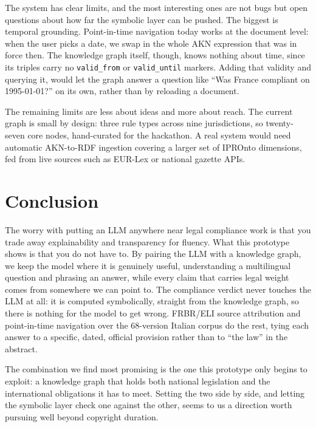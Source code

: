 \documentclass[12pt,a4paper]{article}
\begin{document}
The system has clear limits, and the most interesting ones are not bugs but
open questions about how far the symbolic layer can be pushed. The biggest is
temporal grounding. Point-in-time navigation today works at the document
level: when the user picks a date, we swap in the whole AKN expression that
was in force then. The knowledge graph itself, though, knows nothing about
time, since its triples carry no \texttt{valid\_from} or \texttt{valid\_until}
markers. Adding that validity and querying it, would let the graph answer a question like ``Was France compliant on
1995-01-01?'' on its own, rather than by reloading a document. 

The remaining limits are less about ideas and more about reach. The current
graph is small by design: three rule types across nine jurisdictions, so
twenty-seven core nodes, hand-curated for the hackathon. A real system would
need automatic AKN-to-RDF ingestion covering a larger set of IPROnto dimensions, fed from live sources such as EUR-Lex or national gazette APIs.


\section{Conclusion}

The worry with putting an LLM anywhere near legal compliance work is that you trade away explainability and transparency for fluency. What this prototype shows is that you do not have to. By pairing the LLM with a knowledge graph, we keep the model where it is genuinely useful, understanding a multilingual question and phrasing an answer, while every claim that carries legal weight comes from somewhere we can point to. The compliance verdict never touches the LLM at all: it is computed symbolically, straight from the knowledge graph, so there is nothing for the model to get wrong. FRBR/ELI source attribution and point-in-time navigation over the 68-version Italian corpus do the rest, tying each answer to a specific, dated, official provision rather than to ``the law'' in the abstract.

The combination we find most promising is the one this prototype only begins to exploit: a knowledge graph that holds both national legislation and the international obligations it has to meet. Setting the two side by side, and letting the symbolic layer check one against the other, seems to us a direction worth pursuing well beyond copyright duration. 
\end{document}
